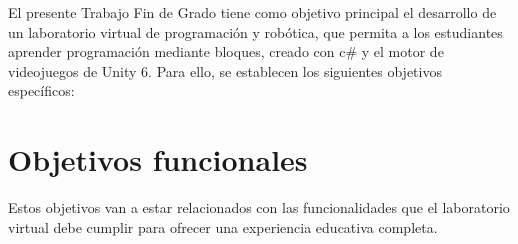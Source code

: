 
El presente Trabajo Fin de Grado tiene como objetivo principal el desarrollo de un laboratorio virtual de programación y robótica, que permita a los estudiantes aprender programación mediante bloques, creado con c# y el motor de videojuegos de Unity 6. 
Para ello, se establecen los siguientes objetivos específicos:

\section {Objetivos funcionales }

Estos objetivos van a estar relacionados con las funcionalidades que el laboratorio virtual debe cumplir para ofrecer una experiencia educativa completa.

